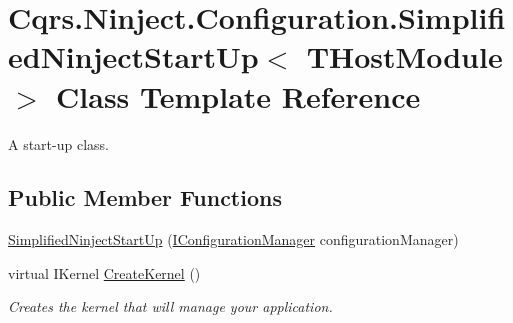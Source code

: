 \hypertarget{classCqrs_1_1Ninject_1_1Configuration_1_1SimplifiedNinjectStartUp}{}\section{Cqrs.\+Ninject.\+Configuration.\+Simplified\+Ninject\+Start\+Up$<$ T\+Host\+Module $>$ Class Template Reference}
\label{classCqrs_1_1Ninject_1_1Configuration_1_1SimplifiedNinjectStartUp}


A start-\/up class.  


\subsection*{Public Member Functions}
\begin{DoxyCompactItemize}
\item 
\hyperlink{classCqrs_1_1Ninject_1_1Configuration_1_1SimplifiedNinjectStartUp_acfbce6e504d9efb64bcfc8d612d28f95_acfbce6e504d9efb64bcfc8d612d28f95}{Simplified\+Ninject\+Start\+Up} (\hyperlink{interfaceCqrs_1_1Configuration_1_1IConfigurationManager}{I\+Configuration\+Manager} configuration\+Manager)
\item 
virtual I\+Kernel \hyperlink{classCqrs_1_1Ninject_1_1Configuration_1_1SimplifiedNinjectStartUp_aac5ea630535b31520d4c1536bc8125ce_aac5ea630535b31520d4c1536bc8125ce}{Create\+Kernel} ()
\begin{DoxyCompactList}\small\item\em Creates the kernel that will manage your application. \end{DoxyCompactList}\end{DoxyCompactItemize}
